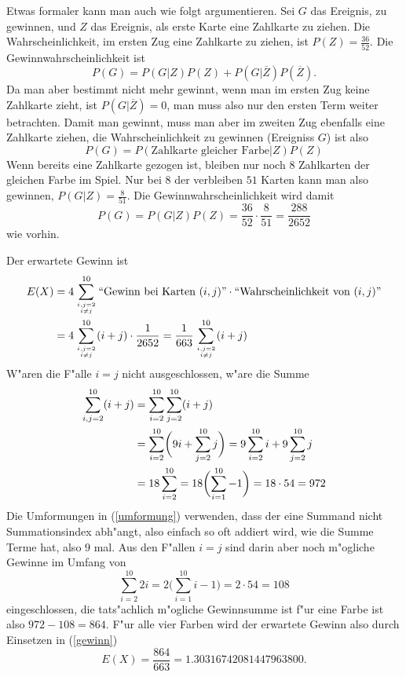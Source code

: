 \begin{loesung}
\begin{teilaufgaben}
Etwas formaler kann man auch wie folgt argumentieren.
Sei $G$ das Ereignis, zu gewinnen, und $Z$ das Ereignis, als erste
Karte eine Zahlkarte zu ziehen.
Die Wahrscheinlichkeit,
im ersten Zug eine Zahlkarte zu ziehen, ist $P(Z)=\frac{36}{52}$.
Die Gewinnwahrscheinlichkeit ist
\[
P(G)=
P(G|Z)P(Z)
+P(G|\overline{Z})P(\overline{Z}).
\]
Da man aber bestimmt nicht mehr gewinnt, wenn man im ersten Zug
keine Zahlkarte zieht, ist $P(G|\overline{Z})=0$, man muss
also nur den ersten Term weiter betrachten.
Damit man
gewinnt, muss man aber im zweiten Zug ebenfalls eine Zahlkarte ziehen,
die Wahrscheinlichkeit zu gewinnen (Ereigniss $G$) ist also
\[
P(G)=P(\text{Zahlkarte gleicher Farbe}|Z)P(Z)
\]
Wenn bereits eine Zahlkarte gezogen ist, bleiben nur noch $8$
Zahlkarten der gleichen Farbe im Spiel. Nur bei $8$ der
verbleiben $51$ Karten kann man also gewinnen, $P(G|Z)=\frac{8}{51}$.
Die Gewinnwahrscheinlichkeit wird damit
\[
P(G)=
P(G|Z)P(Z)
=\frac{36}{52}\cdot\frac{8}{51}= \frac{288}{2652}
\]
wie vorhin.
\item
Der erwartete Gewinn ist
\begin{align}
E(X)&=4\sum_{i,j=2\atop i \ne j}^{10} \text{``Gewinn bei Karten $(i,j)$''}
\cdot\text{``Wahrscheinlichkeit von $(i,j)$''}
\notag
\\
&=
4\sum_{i,j=2\atop i\ne j}^{10}(i+j)\cdot\frac1{2652}
=
\frac{1}{663}\sum_{i,j=2\atop i\ne j}^{10}(i+j)
\label{gewinn}
\end{align}
W"aren die F"alle $i=j$ nicht ausgeschlossen, w"are die Summe
\begin{align}
\sum_{i,j=2}^{10}(i+j)
&=
\sum_{i=2}^{10}\sum_{j=2}^{10}(i+j)
\notag
\\
&=
\sum_{i=2}^{10}\biggl(9i + \sum_{j=2}^{10}j\biggr)
=
9\sum_{i=2}^{10}i +9\sum_{j=2}^{10}j
\label{umformung}
\\
&=
18 \sum_{i=2}^{10}
\notag
=
18 \biggl(\sum_{i=1}^{10}-1\biggr)
=18\cdot 54= 972
\notag
\end{align}
Die Umformungen in (\ref{umformung}) verwenden, dass der eine
Summand nicht Summationsindex abh"angt, also einfach so oft
addiert wird, wie die Summe Terme hat, also $9$ mal.
Aus den F"allen $i=j$ sind darin aber noch
m"ogliche Gewinne im Umfang von
\[
\sum_{i=2}^{10}2i=2\biggl(\sum_{i=1}^{10}i-1\biggr)=2\cdot 54=108
\]
eingeschlossen, die tats"achlich m"ogliche Gewinnsumme ist
f"ur eine Farbe ist also $972-108=864$. F"ur alle vier Farben
wird der erwartete Gewinn also durch Einsetzen in (\ref{gewinn})
\[
E(X)=\frac{864}{663}=
1.30316742081447963800
.
\]


\end{teilaufgaben}
\end{loesung}
